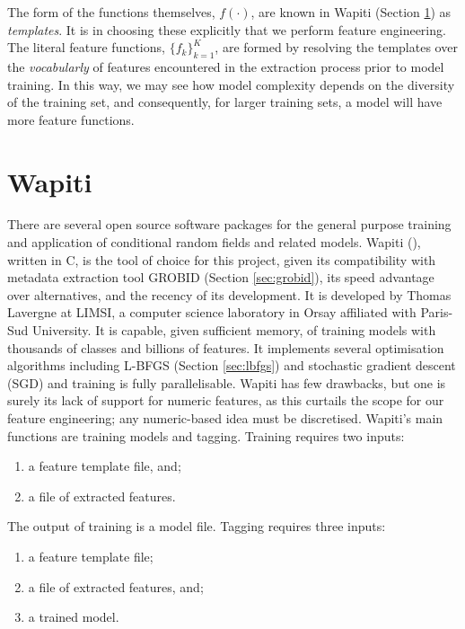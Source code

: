 The form of the functions themselves, $f(\cdot)$, are known in Wapiti (Section \ref{sec:wapiti}) as \emph{templates}. It is in choosing these explicitly that we perform feature engineering. The literal feature functions, $\{f_k\}_{k=1}^K$, are formed by resolving the templates over the \emph{vocabularly} of features encountered in the extraction process prior to model training. In this way, we may see how model complexity depends on the diversity of the training set, and consequently, for larger training sets, a model will have more feature functions. 

\section{Wapiti}
\label{sec:wapiti}

There are several open source software packages for the general purpose training and application of conditional random fields and related models. Wapiti (\cite{lavergne2010practical}), written in C, is the tool of choice for this project, given its compatibility with metadata extraction tool GROBID (Section \ref{sec:grobid}), its speed advantage over alternatives, and the recency of its development. It is developed by Thomas Lavergne at LIMSI, a computer science laboratory in Orsay affiliated with Paris-Sud University. It is capable, given sufficient memory, of training models with thousands of classes and billions of features. It implements several optimisation algorithms including L-BFGS (Section \ref{sec:lbfgs}) and stochastic gradient descent (SGD) and training is fully parallelisable. Wapiti has few drawbacks, but one is surely its lack of support for numeric features, as this curtails the scope for our feature engineering; any numeric-based idea must be discretised. Wapiti's main functions are training models and tagging. Training requires two inputs:

\begin{enumerate}
\item a feature template file, and;
\item a file of extracted features.
\end{enumerate}

The output of training is a model file. Tagging requires three inputs:

\begin{enumerate}
\item a feature template file;
\item a file of extracted features, and;
\item a trained model.
\end{enumerate}

